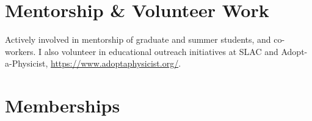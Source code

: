 \documentclass[11pt,a4paper,sans]{moderncv}        %
\begin{document}
\section{Mentorship \& Volunteer Work}
Actively involved in mentorship of graduate and summer students, and co-workers. I also volunteer in educational outreach initiatives at SLAC and Adopt-a-Physicist, \url{https://www.adoptaphysicist.org/}.

\section{Memberships}

\iffalse
\section{Recent Volunteer Work}
\cvitemwithcomment{Feb. 2021}{Cabrillo High School STEM Talk}{}
\cvitemwithcomment{Aug. 2019}{SAGE-S Summer Camp for Girls, SLAC}{}
\cvitemwithcomment{Jan. 2020}{Science Bowl, SLAC}{}
\cvitemwithcomment{Otc. 2017, 2018, 2020}{Adopt-a-Physicist}{}


\section{Programming Languages}
\cvitem{Proficient in}{ASTRA, OPAL-T, Python, MATLAB}
\cvitem{Prior experience with}{IMPACT, Genesis, C/C++}

\fi
\end{document}
